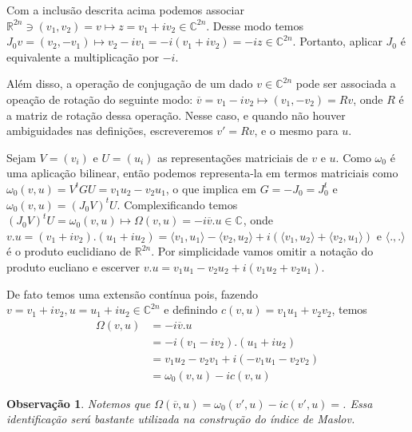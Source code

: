 \documentclass[12pt]{book}
\newtheorem{observacao}[teorema]{Observação}
\newcommand{\complexo}[1]{\mathbb{C}^{#1}}
\newcommand{\estruturacomplexa}{J_{0}}
\newcommand{\formaSimpleticaExtendida}[2]{\Omega(#1, #2)}
\newcommand{\formaSimpleticaPadrao}[2]{\omega_{0}(#1, #2)}
\newcommand{\produtointerno}[2]{\langle #1, #2 \rangle}
\newcommand{\real}[1]{\mathbb{R}^{#1}}
\begin{document}
		Com a inclusão descrita acima podemos associar $\real{2n}\ni (v_{1}, v_{2}) = v \mapsto z = v_{1}+iv_{2} \in \complexo{2n}$. Desse modo temos $\estruturacomplexa v = (v_{2}, -v_{1}) \mapsto v_{2}-iv_{1} = -i(v_{1}+iv_{2}) = -iz \in \complexo{2n}$. Portanto, aplicar $\estruturacomplexa$ é equivalente a multiplicação por $-i$.
		
		Além disso, a operação de conjugação de um dado $v\in \complexo{2n}$ pode ser associada a opeação de rotação do seguinte modo: $\overline{v} = v_{1}-iv_{2} \mapsto (v_{1}, -v_{2}) = Rv$, onde $R$ é a matriz de rotação dessa operação. Nesse caso, e quando não houver ambiguidades nas definições, escreveremos $v' = Rv$, e o mesmo para $u$.
		
		Sejam $V=(v_{i})$ e $U = (u_{i})$ as representações matriciais de $v$ e $u$. Como $\omega_{0}$ é uma aplicação bilinear, então podemos representa-la em termos matriciais como  $\formaSimpleticaPadrao{v}{u} = V^{t}GU=v_{1}u_{2}-v_{2}u_{1}$, o que implica em $G = -\estruturacomplexa = \estruturacomplexa^{t}$ e $\formaSimpleticaPadrao{v}{u} = (\estruturacomplexa V)^{t}U$. Complexificando temos $(\estruturacomplexa V)^{t}U = \formaSimpleticaPadrao{v}{u}  \mapsto \Omega(v,u) = -i\overline{v}.u \in \complexo{}$, onde $v.u = (v_{1}+iv_{2}).(u_{1}+iu_{2}) = \produtointerno{v_{1}}{u_{1}} - \produtointerno{v_{2}}{u_{2}} + i(\produtointerno{v_{1}}{u_{2}}+\produtointerno{v_{2}}{u_{1}})$ e $\produtointerno{.}{.}$ é o produto euclidiano de $\real{2n}$. Por simplicidade vamos omitir a notação do produto eucliano e escerver $v.u = v_{1}u_{1} - v_{2}u_{2} + i(v_{1}u_{2}+v_{2}u_{1})$.
		
		De fato temos uma extensão contínua pois, fazendo $v = v_{1}+iv_{2}, u = u_{1}+iu_{2} \in \complexo{2n}$ e definindo $c(v,u) = v_{1}u_{1} + v_{2}v_{2}$, temos 
		$$
		\begin{aligned}
			\Omega(v,u) 
			&= -i\overline{v}.u
			\\
			&=-i(v_{1}-iv_{2}).(u_{1}+iu_{2}) 
			\\
			&= v_{1}u_{2} - v_{2}v_{1} + i(-v_{1}u_{1} - v_{2}v_{2})
			\\
			&=\formaSimpleticaPadrao{v}{u} - ic(v,u) 
		\end{aligned}	
		$$
		
		\begin{observacao}\label{observacao_forma_extendida}
			Notemos que $\formaSimpleticaExtendida{\overline{v}}{u} = \formaSimpleticaPadrao{v'}{u} - ic(v',u) = $. Essa identificação será bastante utilizada na construção do índice de Maslov.
		\end{observacao}
\end{document}
